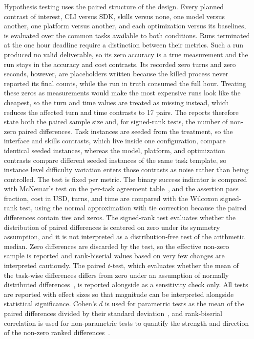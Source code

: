 \documentclass[
english,                 %
bibtex,                  %
]{kththesis}
\numberwithin{listing}{chapter}
\begin{document}
Hypothesis testing uses the paired structure of the design. Every planned contrast of interest, \gls{CLI} versus \gls{SDK}, skills versus none, one model versus another, one platform versus another, and each optimization versus its baselines, is evaluated over the common tasks available to both conditions. Runs terminated at the one hour deadline require a distinction between their metrics. Such a run produced no valid deliverable, so its zero accuracy is a true measurement and the run stays in the accuracy and cost contrasts. Its recorded zero turns and zero seconds, however, are placeholders written because the killed process never reported its final counts, while the run in truth consumed the full hour. Treating these zeros as measurements would make the most expensive runs look like the cheapest, so the turn and time values are treated as missing instead, which reduces the affected turn and time contrasts to 17 pairs. The reports therefore state both the paired sample size and, for signed-rank tests, the number of non-zero paired differences. Task instances are seeded from the treatment, so the interface and skills contrasts, which live inside one configuration, compare identical seeded instances, whereas the model, platform, and optimization contrasts compare different seeded instances of the same task template, so instance level difficulty variation enters those contrasts as noise rather than being controlled. The test is fixed per metric. The binary success indicator is compared with McNemar's test on the per-task agreement table~\cite{mcnemar_note_1947}, and the assertion pass fraction, cost in \gls{USD}, turns, and time are compared with the Wilcoxon signed-rank test, using the normal approximation with tie correction because the paired differences contain ties and zeros. The signed-rank test evaluates whether the distribution of paired differences is centered on zero under its symmetry assumption, and it is not interpreted as a distribution-free test of the arithmetic median. Zero differences are discarded by the test, so the effective non-zero sample is reported and rank-biserial values based on very few changes are interpreted cautiously. The paired $t$-test, which evaluates whether the mean of the task-wise differences differs from zero under an assumption of normally distributed differences~\cite{student_probable_1908}, is reported alongside as a sensitivity check only. All tests are reported with effect sizes so that magnitude can be interpreted alongside statistical significance. Cohen's $d$ is used for parametric tests as the mean of the paired differences divided by their standard deviation~\cite{cohen_statistical_2013}, and rank-biserial correlation is used for non-parametric tests to quantify the strength and direction of the non-zero ranked differences~\cite{cureton_rank-biserial_1956}.
\end{document}
